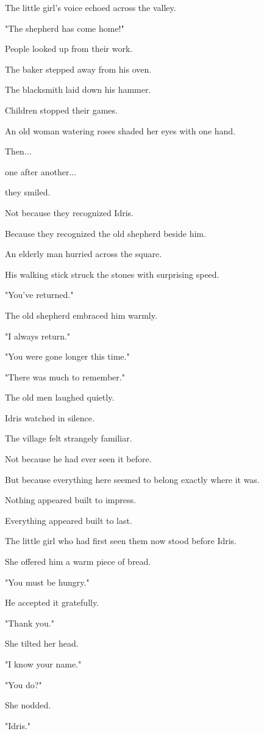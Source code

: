 \documentclass[12pt,openany]{book}
\begin{document}
The little girl's voice echoed across the valley.

"The shepherd has come home!"

People looked up from their work.

The baker stepped away from his oven.

The blacksmith laid down his hammer.

Children stopped their games.

An old woman watering roses shaded her eyes with one hand.

Then...

one after another...

they smiled.

Not because they recognized Idris.

Because they recognized the old shepherd beside him.

An elderly man hurried across the square.

His walking stick struck the stones with surprising speed.

"You've returned."

The old shepherd embraced him warmly.

"I always return."

"You were gone longer this time."

"There was much to remember."

The old men laughed quietly.

Idris watched in silence.

The village felt strangely familiar.

Not because he had ever seen it before.

But because everything here seemed to belong exactly where it was.

Nothing appeared built to impress.

Everything appeared built to last.

The little girl who had first seen them now stood before Idris.

She offered him a warm piece of bread.

"You must be hungry."

He accepted it gratefully.

"Thank you."

She tilted her head.

"I know your name."

"You do?"

She nodded.

"Idris."
\end{document}
